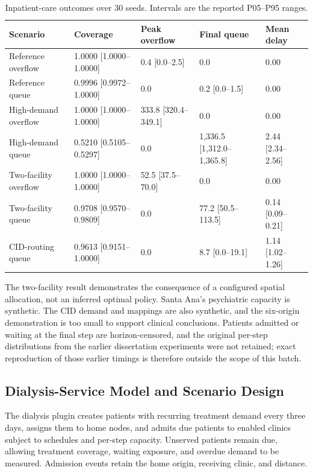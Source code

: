 \documentclass[pdflatex,sn-mathphys-num]{sn-jnl}%
\theoremstyle{thmstyleone}%
\theoremstyle{thmstyletwo}%
\theoremstyle{thmstylethree}%
\begin{document}
\begin{table}[ht]
\centering
\footnotesize
\caption{Inpatient-care outcomes over 30 seeds. Intervals are the reported P05--P95 ranges.}
\label{tbl:inpatient_results}
\begin{tabularx}{\linewidth}{@{}lXXXX@{}}
\toprule
\textbf{Scenario} & \textbf{Coverage} & \textbf{Peak overflow} & \textbf{Final queue} & \textbf{Mean delay} \\ \midrule
Reference overflow & 1.0000 [1.0000--1.0000] & 0.4 [0.0--2.5] & 0.0 & 0.00 \\ 
Reference queue & 0.9996 [0.9972--1.0000] & 0.0 & 0.2 [0.0--1.5] & 0.00 \\ 
High-demand overflow & 1.0000 [1.0000--1.0000] & 333.8 [320.4--349.1] & 0.0 & 0.00 \\ 
High-demand queue & 0.5210 [0.5105--0.5297] & 0.0 & 1,336.5 [1,312.0--1,365.8] & 2.44 [2.34--2.56] \\ 
Two-facility overflow & 1.0000 [1.0000--1.0000] & 52.5 [37.5--70.0] & 0.0 & 0.00 \\ 
Two-facility queue & 0.9708 [0.9570--0.9809] & 0.0 & 77.2 [50.5--113.5] & 0.14 [0.09--0.21] \\ 
CID-routing queue & 0.9613 [0.9151--1.0000] & 0.0 & 8.7 [0.0--19.1] & 1.14 [1.02--1.26] \\ \bottomrule
\end{tabularx}
\end{table}

The two-facility result demonstrates the consequence of a configured spatial allocation, not an inferred optimal policy. Santa Ana's psychiatric capacity is synthetic. The CID demand and mappings are also synthetic, and the six-origin demonstration is too small to support clinical conclusions. Patients admitted or waiting at the final step are horizon-censored, and the original per-step distributions from the earlier dissertation experiments were not retained; exact reproduction of those earlier timings is therefore outside the scope of this batch.

\subsection{Dialysis-Service Model and Scenario Design}

The dialysis plugin creates patients with recurring treatment demand every three days, assigns them to home nodes, and admits due patients to enabled clinics subject to schedules and per-step capacity. Unserved patients remain due, allowing treatment coverage, waiting exposure, and overdue demand to be measured. Admission events retain the home origin, receiving clinic, and distance.
\end{document}
